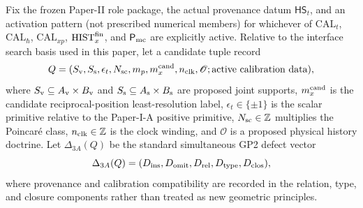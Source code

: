 \documentclass[12pt,a4paper]{article}
\begin{document}
\begin{theorem}
\label{p3a:thm:complete-joint-zero-defect-locus}
Fix the frozen Paper-II role package, the actual provenance datum
\(\mathsf{HS}_t\), and an activation pattern (not prescribed numerical
members) for whichever of
\(\mathrm{CAL}_t\), \(\mathrm{CAL}_{\hbar}\),
\(\mathrm{CAL}_{xp}\), \(\mathrm{HIST}_x^{\rm fin}\), and
\(\mathsf P_{\rm mc}\) are explicitly active.  Relative to the interface
search basis used in this paper, let a candidate tuple record
\[
 Q=(S_{\rm v},S_{\rm s},\epsilon_t,N_{\rm sc},m_p,m_x^{\rm cand},
     n_{\rm clk},\mathscr O; \text{active calibration data}),
\]
where \(S_{\rm v}\subseteq A_{\rm v}\times B_{\rm v}\) and
\(S_{\rm s}\subseteq A_{\rm s}\times B_{\rm s}\) are proposed joint
supports, \(m_x^{\rm cand}\) is the candidate reciprocal-position
least-resolution label, \(\epsilon_t\in\{\pm1\}\) is the scalar primitive relative to the
Paper-I-A positive primitive, \(N_{\rm sc}\in\mathbb Z\) multiplies the
Poincar\'e class, \(n_{\rm clk}\in\mathbb Z\) is the clock winding, and
\(\mathscr O\) is a proposed physical history doctrine.  Let
\(\Delta_{3A}(Q)\) be the standard simultaneous GP2 defect vector
\[
 \Delta_{3A}(Q)
 =(D_{\rm ins},D_{\rm omit},D_{\rm rel},D_{\rm type},D_{\rm clos}),
\]
where provenance and calibration compatibility are recorded in the relation,
type, and closure components rather than treated as new geometric principles.


\end{theorem}
\end{document}
